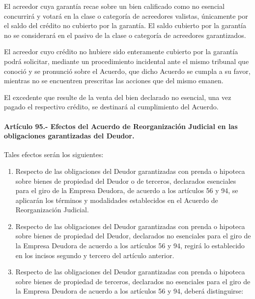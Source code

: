 \documentclass[
]{book}
\begin{document}
El acreedor cuya garantía recae sobre un bien calificado como no esencial concurrirá y votará en la clase o categoría de acreedores valistas, únicamente por el saldo del crédito no cubierto por la garantía. El saldo cubierto por la garantía no se considerará en el pasivo de la clase o categoría de acreedores garantizados.

El acreedor cuyo crédito no hubiere sido enteramente cubierto por la garantía podrá solicitar, mediante un procedimiento incidental ante el mismo tribunal que conoció y se pronunció sobre el Acuerdo, que dicho Acuerdo se cumpla a su favor, mientras no se encuentren prescritas las acciones que del mismo emanen.

El excedente que resulte de la venta del bien declarado no esencial, una vez pagado el respectivo crédito, se destinará al cumplimiento del Acuerdo.

\hypertarget{artuxedculo-95.--efectos-del-acuerdo-de-reorganizaciuxf3n-judicial-en-las-obligaciones-garantizadas-del-deudor.}{%
\paragraph*{Artículo 95.- Efectos del Acuerdo de Reorganización Judicial en las obligaciones garantizadas del Deudor.}\label{artuxedculo-95.--efectos-del-acuerdo-de-reorganizaciuxf3n-judicial-en-las-obligaciones-garantizadas-del-deudor.}}

Tales efectos serán los siguientes:

\begin{enumerate}
\def\labelenumi{\arabic{enumi}.}
\item
  Respecto de las obligaciones del Deudor garantizadas con prenda o hipoteca sobre bienes de propiedad del Deudor o de terceros, declarados esenciales para el giro de la Empresa Deudora, de acuerdo a los artículos 56 y 94, se aplicarán los términos y modalidades establecidos en el Acuerdo de Reorganización Judicial.
\item
  Respecto de las obligaciones del Deudor garantizadas con prenda o hipoteca sobre bienes de propiedad del Deudor, declarados no esenciales para el giro de la Empresa Deudora de acuerdo a los artículos 56 y 94, regirá lo establecido en los incisos segundo y tercero del artículo anterior.
\item
  Respecto de las obligaciones del Deudor garantizadas con prenda o hipoteca sobre bienes de propiedad de terceros, declarados no esenciales para el giro de la Empresa Deudora de acuerdo a los artículos 56 y 94, deberá distinguirse:
\end{enumerate}
\end{document}
